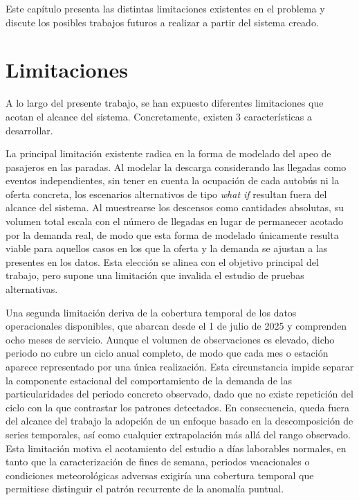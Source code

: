 Este capítulo presenta las distintas limitaciones existentes en el problema y discute los posibles trabajos futuros a realizar
a partir del sistema creado.

\section{Limitaciones}\label{section:limitations}

A lo largo del presente trabajo, se han expuesto diferentes limitaciones que acotan el alcance del sistema. Concretamente,
existen 3 características a desarrollar.

La principal limitación existente radica en la forma de modelado del apeo de pasajeros en
las paradas. Al modelar la descarga considerando las llegadas como eventos independientes,
sin tener en cuenta la ocupación de cada autobús ni la oferta concreta, los escenarios
alternativos de tipo \textit{what if} resultan fuera del alcance del sistema. Al muestrearse
los descensos como cantidades absolutas, su volumen total escala con el número de llegadas
en lugar de permanecer acotado por la demanda real, de modo que esta forma de modelado
únicamente resulta viable para aquellos casos en los que la oferta y la demanda se ajustan
a las presentes en los datos. Esta elección se alinea con el objetivo principal del trabajo,
pero supone una limitación que invalida el estudio de pruebas alternativas.

Una segunda limitación deriva de la cobertura temporal de los datos operacionales
disponibles, que abarcan desde el 1 de julio de 2025 y comprenden ocho meses de servicio.
Aunque el volumen de observaciones es elevado, dicho periodo no cubre un ciclo anual
completo, de modo que cada mes o estación aparece representado por una única realización.
Esta circunstancia impide separar la componente estacional del comportamiento de la demanda
de las particularidades del periodo concreto observado, dado que no existe repetición del
ciclo con la que contrastar los patrones detectados.
En consecuencia, queda fuera del alcance del trabajo la adopción de un enfoque basado en la
descomposición de series temporales, así como cualquier extrapolación más allá del rango
observado. Esta limitación motiva el acotamiento del estudio a días laborables
normales, en tanto que la caracterización de fines de
semana, periodos vacacionales o condiciones meteorológicas adversas exigiría una cobertura
temporal que permitiese distinguir el patrón recurrente de la anomalía puntual.

